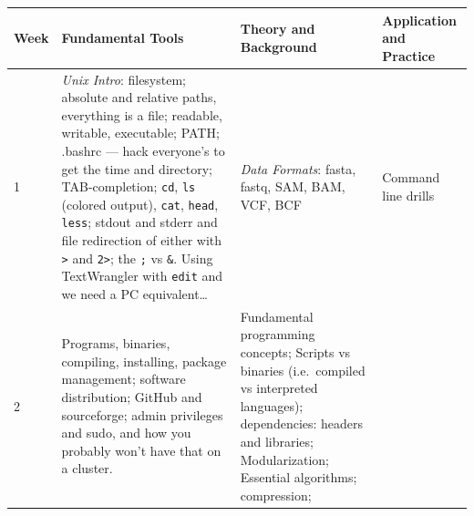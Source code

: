 \documentclass[]{krantz}
\begin{document}
\begin{longtable}[]{@{}llll@{}}
\toprule
\begin{minipage}[b]{0.10\columnwidth}\raggedright
Week\strut
\end{minipage} & \begin{minipage}[b]{0.21\columnwidth}\raggedright
Fundamental Tools\strut
\end{minipage} & \begin{minipage}[b]{0.29\columnwidth}\raggedright
Theory and Background\strut
\end{minipage} & \begin{minipage}[b]{0.29\columnwidth}\raggedright
Application and Practice\strut
\end{minipage}\tabularnewline
\midrule
\endhead
\begin{minipage}[t]{0.10\columnwidth}\raggedright
1\strut
\end{minipage} & \begin{minipage}[t]{0.21\columnwidth}\raggedright
\emph{Unix Intro}: filesystem; absolute and relative paths, everything is a file; readable, writable, executable; PATH; .bashrc --- hack everyone's to get the time and directory; TAB-completion; \texttt{cd}, \texttt{ls} (colored output), \texttt{cat}, \texttt{head}, \texttt{less}; stdout and stderr and file redirection of either with \texttt{\textgreater{}} and \texttt{2\textgreater{}}; the \texttt{;} vs \texttt{\&}. Using TextWrangler with \texttt{edit} and we need a PC equivalent\ldots{}\strut
\end{minipage} & \begin{minipage}[t]{0.29\columnwidth}\raggedright
\emph{Data Formats}: fasta, fastq, SAM, BAM, VCF, BCF\strut
\end{minipage} & \begin{minipage}[t]{0.29\columnwidth}\raggedright
Command line drills\strut
\end{minipage}\tabularnewline
\begin{minipage}[t]{0.10\columnwidth}\raggedright
2\strut
\end{minipage} & \begin{minipage}[t]{0.21\columnwidth}\raggedright
Programs, binaries, compiling, installing, package management; software distribution; GitHub and sourceforge; admin privileges and sudo, and how you probably won't have that on a cluster.\strut
\end{minipage} & \begin{minipage}[t]{0.29\columnwidth}\raggedright
Fundamental programming concepts; Scripts vs binaries (i.e.~compiled vs interpreted languages); dependencies: headers and libraries; Modularization; Essential algorithms; compression;\strut

\end{minipage}
\end{longtable}
\end{document}
